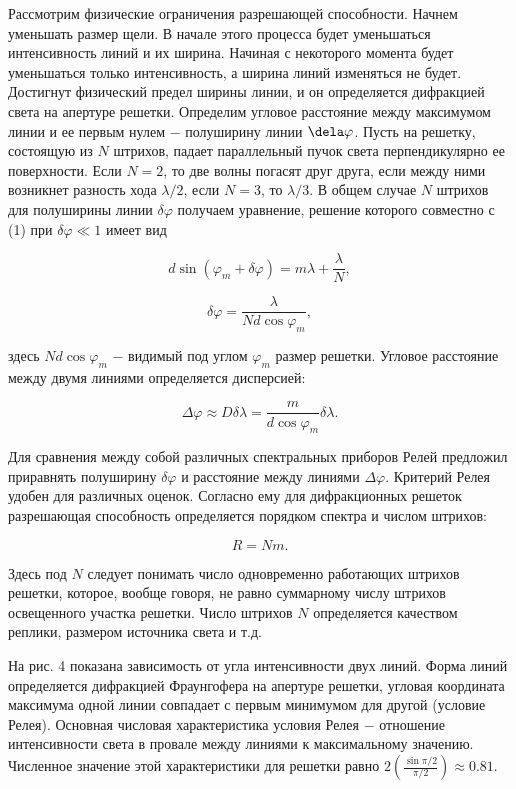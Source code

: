 \documentclass[a4paper,12pt]{article} %
\begin{document}
\hfill \break Рассмотрим физические ограничения разрешающей способности. Начнем уменьшать размер щели. В начале этого процесса будет уменьшаться интенсивность линий и их ширина. Начиная с некоторого момента будет уменьшаться только интенсивность, а ширина линий изменяться не будет. Достигнут физический предел ширины линии, и он определяется дифракцией света на апертуре решетки. Определим угловое расстояние между максимумом линии и ее первым нулем $-$ полуширину линии $\dela \varphi$. Пусть на решетку, состоящую из $N$ штрихов, падает параллельный пучок света перпендикулярно ее поверхности. Если $N = 2$, то две волны погасят друг друга, если между ними возникнет разность хода $\lambda/2$, если $N = 3$, то $\lambda/3$. В общем случае $N$ штрихов для полуширины линии $\delta \varphi$ получаем уравнение, решение которого совместно с (1) при $\delta \varphi \ll 1$ имеет вид

$$
d\sin{(\varphi_{m} + \delta \varphi)} = m\lambda + \frac{\lambda}{N},
$$

$$
\delta \varphi = \frac{\lambda}{Nd\cos{\varphi}_{m}},
$$

\hfill \break здесь $Nd\cos{\varphi}_{m}$ $-$ видимый под углом $\varphi_{m}$ размер решетки. Угловое расстояние между двумя линиями определяется дисперсией:

$$
\Delta \varphi \approx D \delta \lambda = \frac{m}{d\cos{\varphi}_{m}} \delta \lambda.
$$

\hfill \break Для сравнения между собой различных спектральных приборов Релей предложил приравнять полуширину $\delta \varphi$ и расстояние между линиями $\Delta \varphi$. Критерий Релея удобен для различных оценок. Согласно ему для дифракционных решеток разрешающая способность определяется порядком спектра и числом штрихов:

\begin{equation}\label{ linkname }
R = Nm.
\end{equation}
 
\hfill \break Здесь под $N$ следует понимать число одновременно работающих штрихов решетки, которое, вообще говоря, не равно суммарному числу штрихов освещенного участка решетки. Число штрихов $N$ определяется качеством реплики, размером источника света и т.д. 

\hfill \break На рис. 4 показана зависимость от угла интенсивности двух линий. Форма линий определяется дифракцией Фраунгофера на апертуре решетки, угловая координата максимума одной линии совпадает с первым минимумом для другой (условие Релея). Основная числовая характеристика условия Релея $-$ отношение интенсивности света в провале между линиями к максимальному значению. Численное значение этой характеристики для решетки равно $2 \left( \frac{\sin{\pi/2}}{\pi/2} \right) \approx 0.81$.
\end{document}

